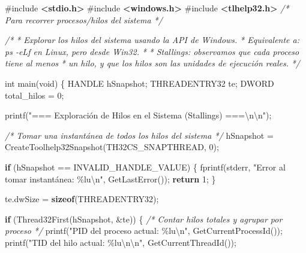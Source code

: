 \documentclass[
  spanish,
]{article}
\newenvironment{Shaded}{}{}
\newcommand{\CommentTok}[1]{\textcolor[rgb]{0.38,0.63,0.69}{\textit{#1}}}
\newcommand{\ControlFlowTok}[1]{\textcolor[rgb]{0.00,0.44,0.13}{\textbf{#1}}}
\newcommand{\DataTypeTok}[1]{\textcolor[rgb]{0.56,0.13,0.00}{#1}}
\newcommand{\DecValTok}[1]{\textcolor[rgb]{0.25,0.63,0.44}{#1}}
\newcommand{\ImportTok}[1]{\textcolor[rgb]{0.00,0.50,0.00}{\textbf{#1}}}
\newcommand{\KeywordTok}[1]{\textcolor[rgb]{0.00,0.44,0.13}{\textbf{#1}}}
\newcommand{\NormalTok}[1]{#1}
\newcommand{\OperatorTok}[1]{\textcolor[rgb]{0.40,0.40,0.40}{#1}}
\newcommand{\PreprocessorTok}[1]{\textcolor[rgb]{0.74,0.48,0.00}{#1}}
\newcommand{\SpecialCharTok}[1]{\textcolor[rgb]{0.25,0.44,0.63}{#1}}
\newcommand{\StringTok}[1]{\textcolor[rgb]{0.25,0.44,0.63}{#1}}
\begin{document}
\begin{Shaded}
\begin{Highlighting}[]
\PreprocessorTok{\#include }\ImportTok{\textless{}stdio.h\textgreater{}}
\PreprocessorTok{\#include }\ImportTok{\textless{}windows.h\textgreater{}}
\PreprocessorTok{\#include }\ImportTok{\textless{}tlhelp32.h\textgreater{}}\PreprocessorTok{  }\CommentTok{/* Para recorrer procesos/hilos del sistema */}

\CommentTok{/*}
\CommentTok{ * Explorar los hilos del sistema usando la API de Windows.}
\CommentTok{ * Equivalente a: ps {-}eLf en Linux, pero desde Win32.}
\CommentTok{ *}
\CommentTok{ * Stallings: observamos que cada proceso tiene al menos}
\CommentTok{ * un hilo, y que los hilos son las unidades de ejecución reales.}
\CommentTok{ */}

\DataTypeTok{int}\NormalTok{ main}\OperatorTok{(}\DataTypeTok{void}\OperatorTok{)} \OperatorTok{\{}
\NormalTok{    HANDLE hSnapshot}\OperatorTok{;}
\NormalTok{    THREADENTRY32 te}\OperatorTok{;}
\NormalTok{    DWORD total\_hilos }\OperatorTok{=} \DecValTok{0}\OperatorTok{;}

\NormalTok{    printf}\OperatorTok{(}\StringTok{"=== Exploración de Hilos en el Sistema (Stallings) ===}\SpecialCharTok{\textbackslash{}n\textbackslash{}n}\StringTok{"}\OperatorTok{);}

    \CommentTok{/* Tomar una instantánea de todos los hilos del sistema */}
\NormalTok{    hSnapshot }\OperatorTok{=}\NormalTok{ CreateToolhelp32Snapshot}\OperatorTok{(}\NormalTok{TH32CS\_SNAPTHREAD}\OperatorTok{,} \DecValTok{0}\OperatorTok{);}

    \ControlFlowTok{if} \OperatorTok{(}\NormalTok{hSnapshot }\OperatorTok{==}\NormalTok{ INVALID\_HANDLE\_VALUE}\OperatorTok{)} \OperatorTok{\{}
\NormalTok{        fprintf}\OperatorTok{(}\NormalTok{stderr}\OperatorTok{,} \StringTok{"Error al tomar instantánea: }\SpecialCharTok{\%lu\textbackslash{}n}\StringTok{"}\OperatorTok{,}\NormalTok{ GetLastError}\OperatorTok{());}
        \ControlFlowTok{return} \DecValTok{1}\OperatorTok{;}
    \OperatorTok{\}}

\NormalTok{    te}\OperatorTok{.}\NormalTok{dwSize }\OperatorTok{=} \KeywordTok{sizeof}\OperatorTok{(}\NormalTok{THREADENTRY32}\OperatorTok{);}

    \ControlFlowTok{if} \OperatorTok{(}\NormalTok{Thread32First}\OperatorTok{(}\NormalTok{hSnapshot}\OperatorTok{,} \OperatorTok{\&}\NormalTok{te}\OperatorTok{))} \OperatorTok{\{}
        \CommentTok{/* Contar hilos totales y agrupar por proceso */}
\NormalTok{        printf}\OperatorTok{(}\StringTok{"PID del proceso actual: }\SpecialCharTok{\%lu\textbackslash{}n}\StringTok{"}\OperatorTok{,}\NormalTok{ GetCurrentProcessId}\OperatorTok{());}
\NormalTok{        printf}\OperatorTok{(}\StringTok{"TID del hilo actual:    }\SpecialCharTok{\%lu\textbackslash{}n\textbackslash{}n}\StringTok{"}\OperatorTok{,}\NormalTok{ GetCurrentThreadId}\OperatorTok{());}


\end{Highlighting}
\end{Shaded}
\end{document}
